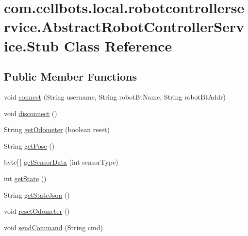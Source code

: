 \hypertarget{classcom_1_1cellbots_1_1local_1_1robotcontrollerservice_1_1_abstract_robot_controller_service_1_1_stub}{\section{com.\-cellbots.\-local.\-robotcontrollerservice.\-Abstract\-Robot\-Controller\-Service.\-Stub Class Reference}
\label{classcom_1_1cellbots_1_1local_1_1robotcontrollerservice_1_1_abstract_robot_controller_service_1_1_stub}
}
\subsection*{Public Member Functions}
\begin{DoxyCompactItemize}
\item 
void \hyperlink{classcom_1_1cellbots_1_1local_1_1robotcontrollerservice_1_1_abstract_robot_controller_service_1_1_stub_a77dc03a75978fed952141da5b1bcad55}{connect} (String username, String robot\-Bt\-Name, String robot\-Bt\-Addr)
\item 
void \hyperlink{classcom_1_1cellbots_1_1local_1_1robotcontrollerservice_1_1_abstract_robot_controller_service_1_1_stub_a710e07cbe83135f80dd1c50a38e82204}{disconnect} ()
\item 
String \hyperlink{classcom_1_1cellbots_1_1local_1_1robotcontrollerservice_1_1_abstract_robot_controller_service_1_1_stub_adf9d553d1a44a9e020b5d5ceef40286b}{get\-Odometer} (boolean reset)
\item 
String \hyperlink{classcom_1_1cellbots_1_1local_1_1robotcontrollerservice_1_1_abstract_robot_controller_service_1_1_stub_a47ec8e376525799f4ded00f5da0a9bcc}{get\-Pose} ()
\item 
byte\mbox{[}$\,$\mbox{]} \hyperlink{classcom_1_1cellbots_1_1local_1_1robotcontrollerservice_1_1_abstract_robot_controller_service_1_1_stub_a1a6fcd2e2ccff7adfc2bbeb1ecc69f9d}{get\-Sensor\-Data} (int sensor\-Type)
\item 
int \hyperlink{classcom_1_1cellbots_1_1local_1_1robotcontrollerservice_1_1_abstract_robot_controller_service_1_1_stub_a8204aa6b69dcdf6d3eb6697a233b15e3}{get\-State} ()
\item 
String \hyperlink{classcom_1_1cellbots_1_1local_1_1robotcontrollerservice_1_1_abstract_robot_controller_service_1_1_stub_ab3f38e17c894858596c1153c70fd7441}{get\-State\-Json} ()
\item 
void \hyperlink{classcom_1_1cellbots_1_1local_1_1robotcontrollerservice_1_1_abstract_robot_controller_service_1_1_stub_a5d72cbb199b31c66b96bfc458e690cd3}{reset\-Odometer} ()
\item 
void \hyperlink{classcom_1_1cellbots_1_1local_1_1robotcontrollerservice_1_1_abstract_robot_controller_service_1_1_stub_a7165d17f93d71a2a2409051757e6ba7d}{send\-Command} (String cmd)
\end{DoxyCompactItemize}


